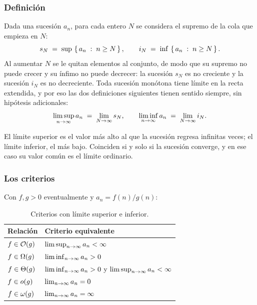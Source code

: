 \documentclass[11pt,letterpaper]{article}
\begin{document}
\subsubsection*{Definición}

Dada una sucesión $a_n$, para cada entero $N$ se considera el supremo
de la cola que empieza en $N$:
\[
    s_N \;=\; \sup\,\left\{ \,a_n \;:\; n \geq N\, \right\},
    \qquad
    i_N \;=\; \inf\,\left\{ \,a_n \;:\; n \geq N\, \right\}.
\]
Al aumentar $N$ se le quitan elementos al conjunto, de modo que su
supremo no puede crecer y su ínfimo no puede decrecer: la sucesión
$s_N$ es no creciente y la sucesión $i_N$ es no decreciente. Toda
sucesión monótona tiene límite en la recta extendida, y por eso las
dos definiciones siguientes tienen sentido siempre, sin hipótesis
adicionales:
\[
    \limsup_{n \to \infty} a_n \;=\; \lim_{N \to \infty} s_N,
    \qquad
    \liminf_{n \to \infty} a_n \;=\; \lim_{N \to \infty} i_N.
\]

\begin{idea}[title={Lectura informal}]
    El límite superior es el valor más alto al que la sucesión regresa
    infinitas veces; el límite inferior, el más bajo. Coinciden si y
    solo si la sucesión converge, y en ese caso su valor común es el
    límite ordinario.
\end{idea}

\subsubsection*{Los criterios}

Con $f, g > 0$ eventualmente y $a_n = f(n)/g(n)$:

\begin{table}[htbp]
  \centering
  \begin{tabular}{@{}ll@{}}
    \toprule
    \textbf{Relación} & \textbf{Criterio equivalente} \\
    \midrule
    $f \in \mathcal{O}\!\left(g\right)$ & $\limsup_{n \to \infty} a_n < \infty$ \\
    $f \in \Omega\!\left(g\right)$ & $\liminf_{n \to \infty} a_n > 0$ \\
    $f \in \Theta\!\left(g\right)$ & $\liminf_{n \to \infty} a_n > 0$ \; y \; $\limsup_{n \to \infty} a_n < \infty$ \\
    $f \in o\!\left(g\right)$ & $\lim_{n \to \infty} a_n = 0$ \\
    $f \in \omega\!\left(g\right)$ & $\lim_{n \to \infty} a_n = \infty$ \\
    \bottomrule
  \end{tabular}
  \caption{Criterios con límite superior e inferior.}
  \label{tab:criterio-limsup}
\end{table}
\end{document}
